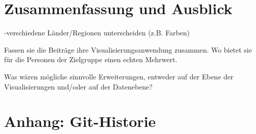 \documentclass[usegeometry=true]{scrartcl}
\begin{document}
\section{Zusammenfassung und Ausblick}

-verschiedene Länder/Regionen unterscheiden (z.B. Farben)

Fassen sie die Beiträge ihre Visualisierungsanwendung zusammen. Wo bietet sie für die Personen der Zielgruppe einen echten Mehrwert.

Was wären mögliche sinnvolle Erweiterungen, entweder auf der Ebene der Visualisierungen und/oder auf der Datenebene?

\section*{Anhang: Git-Historie}

\printbibliography
\end{document}
